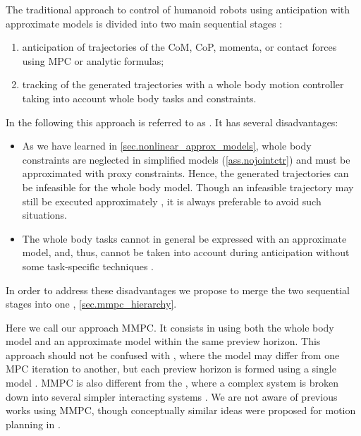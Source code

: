 The traditional approach to control of humanoid robots using anticipation with
approximate models is divided into two main sequential stages
\cite{Kajita2003icra, Herdt2010auro, Morisawa2007icra, Nishiwaki2009ijrr}:
%
\begin{enumerate}
    \item anticipation of trajectories of the \ac{CoM}, \ac{CoP}, momenta, or
        contact forces using \ac{MPC} or analytic formulas;

    \item tracking of the generated trajectories with a whole body motion
        controller taking into account whole body tasks and constraints.
\end{enumerate}
%
In the following this approach is referred to as . It has
several disadvantages:
%
\begin{itemize}
    \item As we have learned in \cref{sec.nonlinear_approx_models}, whole body
        constraints are neglected in simplified models (\cref{ass.nojointctr})
        and must be approximated with proxy constraints. Hence, the generated
        trajectories can be infeasible for the whole body model. Though an
        infeasible trajectory may still be executed approximately
        \cite{Kanehiro2009humanoids}, it is always preferable to avoid such
        situations.

    \item The whole body tasks cannot in general be expressed with an
        approximate model, and, thus, cannot be taken into account during
        anticipation without some  task-specific techniques
        \cite{Yoshida2006humanoids, Nishiwaki2003icra, Fukumoto2004iros}.
\end{itemize}
%
In order to address these disadvantages we propose to merge the two sequential
stages into one \cite{Sherikov2014humanoids, Sherikov2015humanoids},
\cref{sec.mmpc_hierarchy}.


Here we call our approach \acf{MMPC}. It consists in using both the whole body
model and an approximate model within the same preview horizon. This approach
should not be confused with , where the
model may differ from one \ac{MPC} iteration to another, but each preview
horizon is formed using a single model \cite[Chapter~15]{Rossiter2003mpc}.
\ac{MMPC} is also different from the ,
where a complex system is broken down into several simpler interacting systems
\cite[Chapter~6]{Rawlings2009mpc}. We are not aware of previous works using
\ac{MMPC}, though conceptually similar ideas were proposed for motion planning
in \cite{Dai2014humanoids, Kanoun2010ijrr}.


